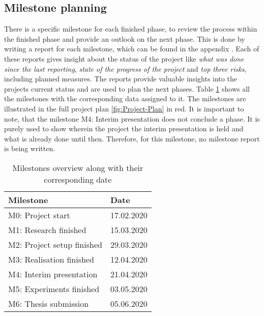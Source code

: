 \subsection{Milestone planning}
\label{sec:Milestone-Planning}
There is a specific milestone for each finished phase, to review the process within the finished phase and provide an outlook on the next phase. This is done by writing a report for each milestone, which can be found in the appendix . Each of these reports gives insight about the status of the project like \textit{what was done since the last reporting}, \textit{state of the progress of the project} and \textit{top three risks}, including planned measures. The reports provide valuable insights into the projects current status and are used to plan the next phases. Table \ref{tab:Milestones} shows all the milestones with the corresponding data assigned to it. The milestones are illustrated in the full project plan \ref{fig:Project-Plan} in red.
\newline
\newline
It is important to note, that the milestone M4: Interim presentation does not conclude a phase. It is purely used to show wherein the project the interim presentation is held and what is already done until then. Therefore, for this milestone, no milestone report is being written.

\begin{table}[htbp]
    \centering
    \caption{Milestones overview along with their corresponding date}
	\label{tab:Milestones}
    \begin{tabular}{p{} | p{}}
        \toprule
        \textbf{Milestone} & \textbf{Date} \\ 
        \midrule[1pt]
        M0: Project start & 17.02.2020\\
        \hline
        M1: Research finished & 15.03.2020\\
        \hline
        M2: Project setup finished & 29.03.2020\\
        \hline
        M3: Realisation finished & 12.04.2020\\
        \hline
        M4: Interim presentation & 21.04.2020\\
        \hline
        M5: Experiments finished & 03.05.2020\\
        \hline
        M6: Thesis submission & 05.06.2020\\
        \bottomrule
    \end{tabular}
\end{table}

